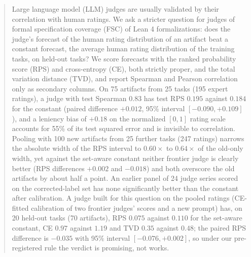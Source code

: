 \begin{abstract}
Large language model (LLM) judges are usually validated by their correlation with human ratings.
We ask a stricter question for judges of formal specification coverage (FSC) of Lean 4 formalizations: does the judge's forecast of the human rating distribution of an artifact beat a constant forecast, the average human rating distribution of the training tasks, on held-out tasks?
We score forecasts with the ranked probability score (RPS) and cross-entropy (CE), both strictly proper, and the total variation distance (TVD), and report Spearman and Pearson correlation only as secondary columns.
On 75 artifacts from 25 tasks (195 expert ratings), a judge with test Spearman $0.83$ has test RPS $0.195$ against $0.184$ for the constant (paired difference $+0.012$, 95\% interval $[-0.090,+0.109]$), and a leniency bias of $+0.18$ on the normalized $[0,1]$ rating scale accounts for 55\% of its test squared error and is invisible to correlation.
Pooling with 100 new artifacts from 25 further tasks (247 ratings) narrows the absolute width of the RPS interval to $0.60\times$ to $0.64\times$ of the old-only width, yet against the set-aware constant neither frontier judge is clearly better (RPS differences $+0.002$ and $-0.018$) and both overscore the old artifacts by about half a point.
An earlier panel of 24 judge series scored on the corrected-label set has none significantly better than the constant after calibration.
A judge built for this question on the pooled ratings (CE-fitted calibration of two frontier judges' scores and a new prompt) has, on 20 held-out tasks (70 artifacts), RPS $0.075$ against $0.110$ for the set-aware constant, CE $0.97$ against $1.19$ and TVD $0.35$ against $0.48$; the paired RPS difference is $-0.035$ with 95\% interval $[-0.076,+0.002]$, so under our pre-registered rule the verdict is promising, not works.
\end{abstract}
